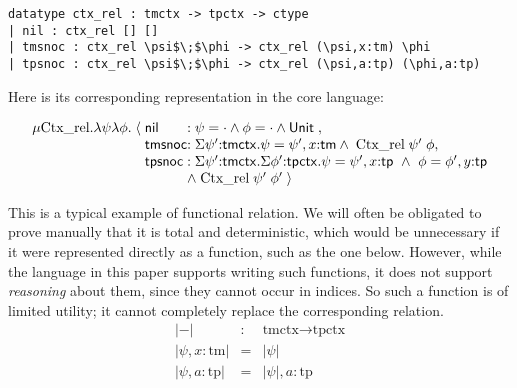 \documentclass{article}
\begin{document}

\begin{lstlisting}
datatype ctx_rel : tmctx -> tpctx -> ctype
| nil : ctx_rel [] []
| tmsnoc : ctx_rel \psi$\;$\phi -> ctx_rel (\psi,x:tm) \phi
| tpsnoc : ctx_rel \psi$\;$\phi -> ctx_rel (\psi,a:tp) (\phi,a:tp)
\end{lstlisting}


Here is its corresponding representation in the core language: 

\[
\begin{array}{r@{\;}c@{\;}l@{}l}
\mu \text{Ctx\_rel}. \lambda \psi\lambda \phi. & \langle & \m{nil}\; &:  \psi
= \cdot \andalso \phi = \cdot \andalso \tunit\;, \\
&  & \m{tmsnoc} & : \Sigma \psi'{:}{\m{tmctx}}. \psi = \psi', x{:}\m{tm}
\andalso\;\text{Ctx\_rel}\;\psi'\;\phi ,\\
&  & \m{tpsnoc} & : \Sigma \psi'{:}{\m{tmctx}}. \Sigma
\phi'{:}{\m{tpctx}}. \psi = \psi', x{:}\m{tp} ~\andalso~ \phi = \phi',
y{:}\m{tp} \\
&&& \andalso\;\text{Ctx\_rel}\;\psi'\;\phi' \;\rangle 
\end{array}
\]

This is a typical example of
functional relation. We will often be obligated to prove manually
that it is total and deterministic, which would be unnecessary if it
were represented directly as a function, such as the one
below. However, while the language in this paper supports writing such
functions, it does not support \emph{reasoning} about them, since they
cannot occur in indices. So such a function is of limited
utility; it cannot completely replace the corresponding relation.
\begin{eqnarray*}
|-| & : & \text{tmctx} \rightarrow \text{tpctx} \\
| \psi , x:\text{tm} | & = & | \psi | \\
| \psi , a:\text{tp} | & = & | \psi | , a:\text{tp}
\end{eqnarray*}
\end{document}
